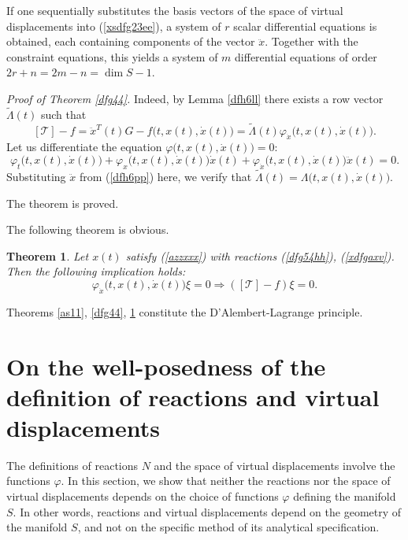 \documentclass[reqno,12pt]{amsproc}
\newtheorem{theo}{Theorem}
\newcommand\ph\varphi
\begin{document}
If one sequentially substitutes the basis vectors of the space of virtual displacements into (\ref{xsdfg23ee}), a system of $r$ scalar differential equations is obtained, each containing components of the vector $\ddot x$. Together with the constraint equations, this yields a system of $m$ differential equations of order $2r+n=2m-n=\dim S-1$.


{\it Proof of Theorem \ref{dfg44}.} Indeed, by Lemma \ref{dfh6ll} there exists a row vector
$\tilde\Lambda(t)$ such that 
\begin{equation}\label{dfh6pp}
[\mathscr T]-f=\ddot x^T(t)G-f\big(t,x(t),\dot x(t)\big)=\tilde\Lambda(t)\ph_{\dot x}\big(t,x(t),\dot x(t)\big).\end{equation}
Let us differentiate the equation $\ph\big(t,x(t),\dot x(t)\big)=0:$
$$\ph_t\big(t,x(t),\dot x(t)\big)+\ph_x\big(t,x(t),\dot x(t)\big)\dot x(t)+\ph_{\dot x}\big(t,x(t),\dot x(t)\big)\ddot x(t)=0.$$
Substituting $\ddot x$ from (\ref{dfh6pp}) here, we verify that 
$\tilde \Lambda(t)=\Lambda\big(t,x(t),\dot x(t)\big).$

The theorem is proved.




The following theorem is obvious.
\begin{theo}\label{dfg4xde4}
Let $x(t)$ satisfy (\ref{azzxxx}) with reactions (\ref{dfg54hh}), (\ref{xdfgaxv}).
Then the following implication holds: $$\ph_{\dot x}\big(t,x(t),\dot x(t)\big)\xi=0\Longrightarrow
([\mathscr T]-f)\xi=0.$$\end{theo}

Theorems \ref{as11}, \ref{dfg44}, \ref{dfg4xde4} constitute the D'Alembert-Lagrange principle.





\section{On the well-posedness of the definition of reactions and virtual displacements}\label{sdf55}
The definitions of reactions $N$ and the space of virtual displacements involve the functions $\ph$.
In this section, we show that neither the reactions nor the space of virtual displacements depends on the choice of functions $\ph$ defining the manifold $S$. In other words, reactions and virtual displacements depend on the geometry of the manifold $S$, and not on the specific method of its analytical specification.
\end{document}
